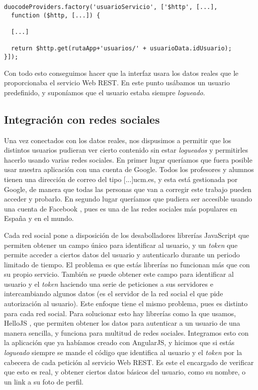 \vspace{1em}
{\codesize
\lstset{}
\begin{lstlisting}[frame=single]
duocodeProviders.factory('usuarioServicio', ['$http', [...], 
  function ($http, [...]) {

  [...]
  
  return $http.get(rutaApp+'usuarios/' + usuarioData.idUsuario);
}]);
\end{lstlisting}
}
\vspace{1em}

Con todo esto conseguimos hacer que la interfaz usara los datos reales que le proporcionaba el servicio Web REST. En este punto usábamos un usuario predefinido, y suponíamos que el usuario estaba siempre \emph{logueado}.

\subsection{Integración con redes sociales\label{subsec:interfaz}}
Una vez conectados con los datos reales, nos dispusimos a permitir que los distintos usuarios pudieran ver cierto contenido sin estar \emph{logueados} y permitirles hacerlo usando varias redes sociales. En primer lugar queríamos que fuera posible usar nuestra aplicación con una cuenta de Google. Todos los profesores y alumnos tienen una dirección de correo del tipo [...]ucm.es, y esta está gestionada por Google, de manera que todas las personas que van a corregir este trabajo pueden acceder y probarlo. En segundo lugar queríamos que pudiera ser accesible usando una cuenta de Facebook \cite{facebook}, pues es una de las redes sociales más populares en España y en el mundo. 

\vspace{1em}
Cada red social pone a disposición de los desabolladores librerías JavaScript que permiten obtener un campo único para identificar al usuario, y un \emph{token} que permite acceder a ciertos datos del usuario y autenticarlo durante un periodo limitado de tiempo. El problema es que estás librerías no funcionan más que con su propio servicio. También se puede obtener este campo para identificar al usuario y el \emph{token} haciendo una serie de peticiones a sus servidores e intercambiando algunos datos (es el servidor de la red social el que pide autorización al usuario). Este enfoque tiene el mismo problema, pues es distinto para cada red social. Para solucionar esto hay librerías como la que usamos, HelloJS \cite{hello}, que permiten obtener los datos para autenticar a un usuario de una manera sencilla, y funciona para multitud de redes sociales. Integramos esto con la aplicación que ya habíamos creado con AngularJS, y hicimos que si estás \emph{logueado} siempre se mande el código que identifica al usuario y el \emph{token} por la cabecera de cada petición al servicio Web REST. Es este el encargado de verificar que esto es real, y obtener ciertos datos básicos del usuario, como su nombre, o un link a su foto de perfil.

